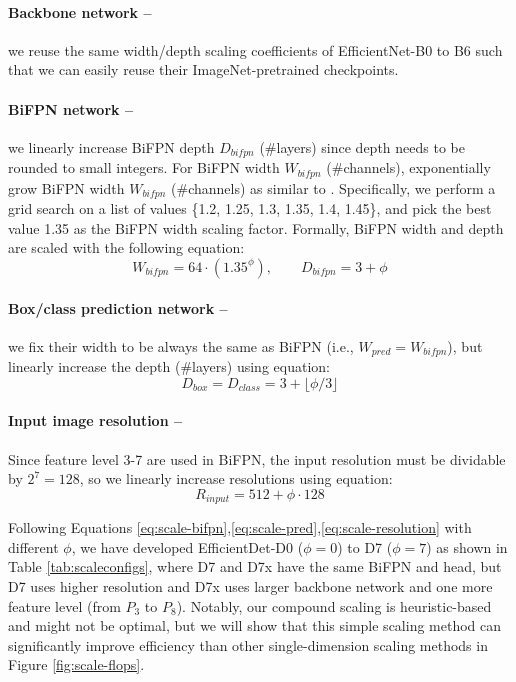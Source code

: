 \documentclass[10pt,twocolumn,letterpaper]{article}
\begin{document}
\paragraph{Backbone network --} we  reuse the same width/depth scaling coefficients of  EfficientNet-B0 to B6 \cite{efficientnet19} such that we can easily reuse their ImageNet-pretrained checkpoints.

\paragraph{BiFPN network --} we linearly increase BiFPN depth $D_{bifpn}$ (\#layers) since depth needs to be rounded to small integers. For BiFPN width $W_{bifpn}$  (\#channels), exponentially grow BiFPN width $W_{bifpn}$ (\#channels) as similar to \cite{efficientnet19}. Specifically, we perform a grid search on a list of values \{1.2, 1.25, 1.3, 1.35, 1.4, 1.45\}, and pick the best value 1.35 as the BiFPN width scaling factor.  Formally, BiFPN width and depth are scaled with the following equation:
\begin{equation} \label{eq:scale-bifpn}
W_{bifpn} = 64 \cdot \left(1.35^{\phi}\right), \quad \quad
D_{bifpn} = 3 + \phi
\end{equation}


\paragraph{Box/class  prediction network  -- } we fix their width to be always the same as BiFPN (i.e., $W_{pred} = W_{bifpn}$), but linearly increase the depth (\#layers) using equation:
\begin{equation} \label{eq:scale-pred}
D_{box} = D_{class} = 3 + \lfloor \phi / 3 \rfloor
\end{equation}

\paragraph{Input image resolution -- } Since feature level 3-7 are used in BiFPN, the input resolution must be dividable by $2^7=128$, so we linearly increase resolutions using equation:
\begin{equation} \label{eq:scale-resolution}
R_{input} = 512 + \phi \cdot 128
\end{equation}

\noindent Following Equations \ref{eq:scale-bifpn},\ref{eq:scale-pred},\ref{eq:scale-resolution} with different $\phi$, we have developed EfficientDet-D0  ($\phi=0$) to D7 ($\phi=7$) as shown in Table \ref{tab:scaleconfigs}, where D7 and D7x have the same BiFPN and head, but D7 uses higher resolution and D7x uses larger backbone network and one more feature level (from $P_3$ to $P_8$). Notably, our compound scaling is heuristic-based and might  not be optimal, but we will show that this simple scaling method can significantly improve efficiency than other single-dimension scaling methods in Figure \ref{fig:scale-flops}.
\end{document}
